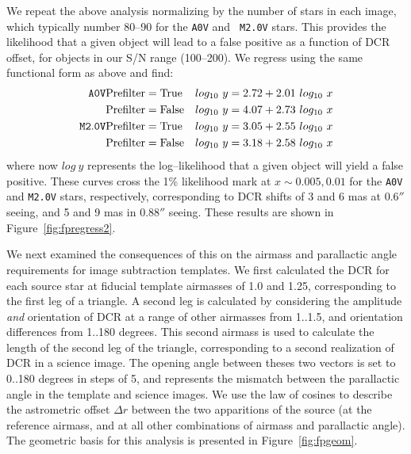 \documentclass[prd, nofootinbib, floatfix, 11pt, tightenlines, times]{article}
\begin{document}
We repeat the above analysis normalizing by the number of stars in
each image, which typically number 80--90 for the {\tt A0V} and {\tt
  M2.0V} stars.  This provides the likelihood that a given object will
lead to a false positive as a function of DCR offset, for objects in
our S/N range (100--200).  We regress using the same functional form
as above and find:
\begin{eqnarray}
{\tt A0V}   & {\rm Prefilter=True}  & log_{10}~y = 2.72 + 2.01 ~log_{10}~x \\ \nonumber
            & {\rm Prefilter=False} & log_{10}~y = 4.07 + 2.73 ~log_{10}~x \\ \nonumber
{\tt M2.0V} & {\rm Prefilter=True}  & log_{10}~y = 3.05 + 2.55 ~log_{10}~x \\ \nonumber
            & {\rm Prefilter=False} & log_{10}~y = 3.18 + 2.58 ~log_{10}~x 
\end{eqnarray}
where now $log~y$ represents the log--likelihood that a given object
will yield a false positive.  These curves cross the 1\% likelihood
mark at $x \sim 0.005, 0.01$ for the {\tt A0V} and {\tt M2.0V} stars,
respectively, corresponding to DCR shifts of 3 and 6 mas at $0.6''$
seeing, and 5 and 9 mas in $0.88''$ seeing.  These results are shown in
Figure~\ref{fig:fpregress2}.

We next examined the consequences of this on the airmass and
parallactic angle requirements for image subtraction templates.  We
first calculated the DCR for each source star at fiducial template
airmasses of 1.0 and 1.25, corresponding to the first leg of a
triangle.  A second leg is calculated by considering the amplitude
{\it and} orientation of DCR at a range of other airmasses from
1..1.5, and orientation differences from 1..180 degrees.  This second
airmass is used to calculate the length of the second leg of the
triangle, corresponding to a second realization of DCR in a science
image.  The opening angle between theses two vectors is set to 0..180
degrees in steps of 5, and represents the mismatch between the
parallactic angle in the template and science images.  We use the law
of cosines to describe the astrometric offset $\Delta r$ between the two
apparitions of the source (at the reference airmass, and at all other
combinations of airmass and parallactic angle).  The geometric basis
for this analysis is presented in Figure~\ref{fig:fpgeom}.
\end{document}
